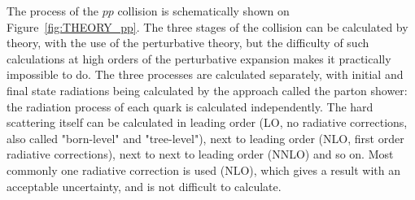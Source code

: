 \begin{figure}
\end{figure}

The process of the $pp$ collision is schematically shown on Figure~\ref{fig:THEORY_pp}. The three stages of the collision can be calculated by theory, with the use of the perturbative theory, but the difficulty of such calculations at high orders of the perturbative expansion makes it practically impossible to do. The three processes are calculated separately, with initial and final state radiations being calculated by the approach called the parton shower: the radiation process of each quark is calculated independently. The hard scattering itself can be calculated in leading order (LO, no radiative corrections, also called "born-level" and "tree-level"), next to leading order (NLO, first order radiative corrections), next to next to leading order (NNLO) and so on. Most commonly one radiative correction is used (NLO), which gives a result with an acceptable uncertainty, and is not difficult to calculate.

\begin{figure}
\end{figure}

